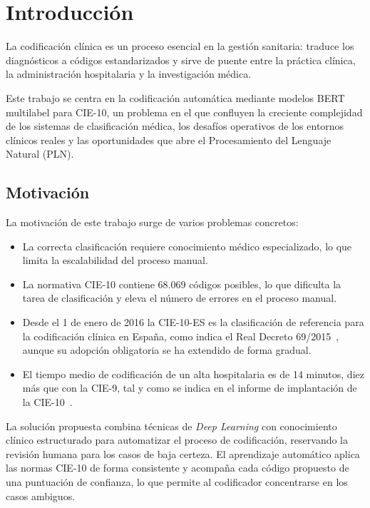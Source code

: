 \chapter{Introducción}
\label{cap:Introduccion}

La codificación clínica es un proceso esencial en la gestión sanitaria: traduce los diagnósticos a códigos estandarizados y sirve de puente entre la práctica clínica, la administración hospitalaria y la investigación médica.

Este trabajo se centra en la codificación automática mediante modelos BERT multilabel para CIE-10, un problema en el que confluyen la creciente complejidad de los sistemas de clasificación médica, los desafíos operativos de los entornos clínicos reales y las oportunidades que abre el Procesamiento del Lenguaje Natural (PLN).

\section{Motivación}

La motivación de este trabajo surge de varios problemas concretos:
\begin{itemize}
\item La correcta clasificación requiere conocimiento médico especializado, lo que limita la escalabilidad del proceso manual.
\item La normativa CIE-10 contiene 68.069 códigos posibles, lo que dificulta la tarea de clasificación y eleva el número de errores en el proceso manual.
\item Desde el 1 de enero de 2016 la CIE-10-ES es la clasificación de referencia para la codificación clínica en España, como indica el Real Decreto 69/2015~\cite{rd692015}, aunque su adopción obligatoria se ha extendido de forma gradual.
\item El tiempo medio de codificación de un alta hospitalaria es de 14 minutos, diez más que con la CIE-9, tal y como se indica en el informe de implantación de la CIE-10~\cite{sanidad2016cie10}.
\end{itemize}

La solución propuesta combina técnicas de \emph{Deep Learning} con conocimiento clínico estructurado para automatizar el proceso de codificación, reservando la revisión humana para los casos de baja certeza. El aprendizaje automático aplica las normas CIE-10 de forma consistente y acompaña cada código propuesto de una puntuación de confianza, lo que permite al codificador concentrarse en los casos ambiguos.


